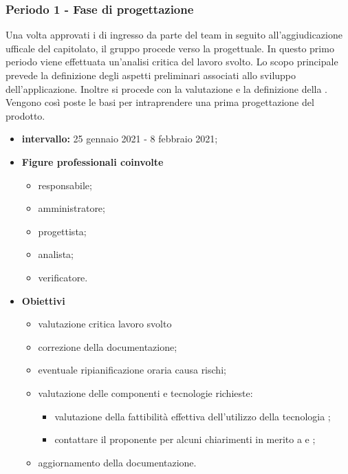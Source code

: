        \subsubsection{Periodo 1 - Fase di progettazione}
        Una volta approvati i  di ingresso da parte del team in seguito all'aggiudicazione ufficale del capitolato, il gruppo procede verso la  progettuale. In questo primo periodo viene effettuata un'analisi critica del lavoro svolto. Lo scopo principale prevede la definizione degli aspetti preliminari associati allo sviluppo dell'applicazione. Inoltre si procede con la valutazione e la definizione della . Vengono così poste le basi per intraprendere una prima progettazione del prodotto.
        \begin{itemize}
                \item \textbf{intervallo: } 25 gennaio 2021 - 8 febbraio 2021;
                \item  \textbf{Figure professionali coinvolte}
                \begin{itemize}
                    \item responsabile;
                    \item amministratore;
                    \item progettista;
                    \item analista;
                    \item verificatore.
                \end{itemize}
                \item \textbf{Obiettivi}
                \begin{itemize}
                    \item valutazione critica lavoro svolto
                    \item correzione della documentazione;
                    \item eventuale ripianificazione oraria causa rischi;
                    \item valutazione delle componenti e tecnologie richieste:
                    \begin{itemize}
                        \item valutazione della fattibilità effettiva dell'utilizzo della tecnologia ;
                        \item contattare il proponente per alcuni chiarimenti in merito a  e ;
                    \end{itemize}

                    \item aggiornamento della documentazione.
                    
                \end{itemize}
        \end{itemize}


